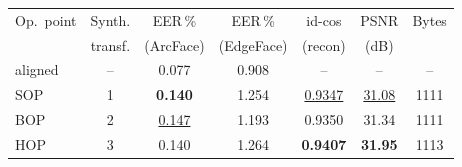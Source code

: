 \begin{tabular}{lcccccc}
\toprule
Op.\ point & Synth. & EER\,\% & EER\,\% & id-cos & PSNR & Bytes \\
 & transf. & (ArcFace) & (EdgeFace) & (recon) & (dB) & \\
\midrule
aligned & -- & 0.077 & 0.908 & -- & -- & -- \\
\midrule
SOP & 1 & \cellcolor{green!25}\textbf{0.140} & 1.254 & \cellcolor{red!22}\underline{0.9347} & \cellcolor{red!22}\underline{31.08} & 1111 \\
BOP & 2 & \cellcolor{red!22}\underline{0.147} & 1.193 & 0.9350 & 31.34 & 1111 \\
HOP & 3 & 0.140 & 1.264 & \cellcolor{green!25}\textbf{0.9407} & \cellcolor{green!25}\textbf{31.95} & 1113 \\
\bottomrule
\end{tabular}
